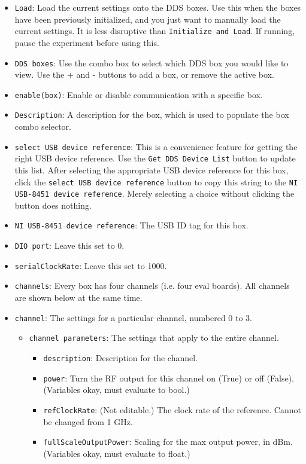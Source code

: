 \documentclass[pdftex,11pt,letterpaper]{article}
\begin{document}
\begin{itemize}
\item \texttt{Load}:  Load the current settings onto the DDS boxes.  Use this when the boxes have been previously initialized, and you just want to manually load the current settings.  It is less disruptive than 
\texttt{Initialize and Load}.  If running, pause the experiment before using this.
\item \texttt{DDS boxes}:  Use the combo box to select which DDS box you would like to view.  Use the + and - buttons to add a box, or remove the active box.
\item \texttt{enable(box)}:  Enable or disable communication with a specific box.
\item \texttt{Description}:  A description for the box, which is used to populate the box combo selector.
\item \texttt{select USB device reference}:  This is a convenience feature for getting the right USB device reference.  Use the \texttt{Get DDS Device List} button to update this list.  After selecting the appropriate USB device reference for this box, click the \texttt{select USB device reference} button to copy this string to the \texttt{NI USB-8451 device reference}.  Merely selecting a choice without clicking the button does nothing.
\item \texttt{NI USB-8451 device reference}:  The USB ID tag for this box.
\item \texttt{DIO port}:  Leave this set to 0.
\item \texttt{serialClockRate}:  Leave this set to 1000.
\item \texttt{channels}:  Every box has four channels (i.e. four eval boards).  All channels are shown below at the same time.
\item \texttt{channel}:  The settings for a particular channel, numbered 0 to 3.
\begin{itemize}
\item \texttt{channel parameters}:  The settings that apply to the entire channel.
\begin{itemize}
\item \texttt{description}:  Description for the channel.
\item \texttt{power}:  Turn the RF output for this channel on (True) or off (False).  (Variables okay, must evaluate to bool.)
\item \texttt{refClockRate}:  (Not editable.)  The clock rate of the reference.  Cannot be changed from 1 GHz.
\item \texttt{fullScaleOutputPower}:  Scaling for the max output power, in dBm.  (Variables okay, must evaluate to float.)

\end{itemize}
\end{itemize}
\end{itemize}
\end{document}
